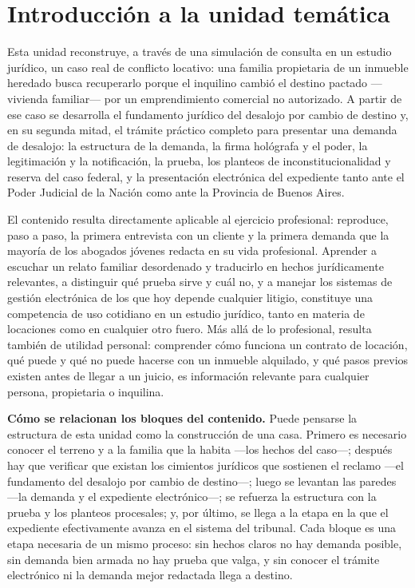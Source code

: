\documentclass[12pt,oneside]{book}
\begin{document}
\tableofcontents
\clearpage

\chapter*{Introducción a la unidad temática}

Esta unidad reconstruye, a través de una simulación de consulta en un estudio jurídico, un caso real de conflicto locativo: una familia propietaria de un inmueble heredado busca recuperarlo porque el inquilino cambió el destino pactado —vivienda familiar— por un emprendimiento comercial no autorizado. A partir de ese caso se desarrolla el fundamento jurídico del desalojo por cambio de destino y, en su segunda mitad, el trámite práctico completo para presentar una demanda de desalojo: la estructura de la demanda, la firma hológrafa y el poder, la legitimación y la notificación, la prueba, los planteos de inconstitucionalidad y reserva del caso federal, y la presentación electrónica del expediente tanto ante el Poder Judicial de la Nación como ante la Provincia de Buenos Aires.

El contenido resulta directamente aplicable al ejercicio profesional: reproduce, paso a paso, la primera entrevista con un cliente y la primera demanda que la mayoría de los abogados jóvenes redacta en su vida profesional. Aprender a escuchar un relato familiar desordenado y traducirlo en hechos jurídicamente relevantes, a distinguir qué prueba sirve y cuál no, y a manejar los sistemas de gestión electrónica de los que hoy depende cualquier litigio, constituye una competencia de uso cotidiano en un estudio jurídico, tanto en materia de locaciones como en cualquier otro fuero. Más allá de lo profesional, resulta también de utilidad personal: comprender cómo funciona un contrato de locación, qué puede y qué no puede hacerse con un inmueble alquilado, y qué pasos previos existen antes de llegar a un juicio, es información relevante para cualquier persona, propietaria o inquilina.

\begin{important}
\textbf{Cómo se relacionan los bloques del contenido.} Puede pensarse la estructura de esta unidad como la construcción de una casa. Primero es necesario conocer el terreno y a la familia que la habita —los hechos del caso—; después hay que verificar que existan los cimientos jurídicos que sostienen el reclamo —el fundamento del desalojo por cambio de destino—; luego se levantan las paredes —la demanda y el expediente electrónico—; se refuerza la estructura con la prueba y los planteos procesales; y, por último, se llega a la etapa en la que el expediente efectivamente avanza en el sistema del tribunal. Cada bloque es una etapa necesaria de un mismo proceso: sin hechos claros no hay demanda posible, sin demanda bien armada no hay prueba que valga, y sin conocer el trámite electrónico ni la demanda mejor redactada llega a destino.
\end{important}
\end{document}
